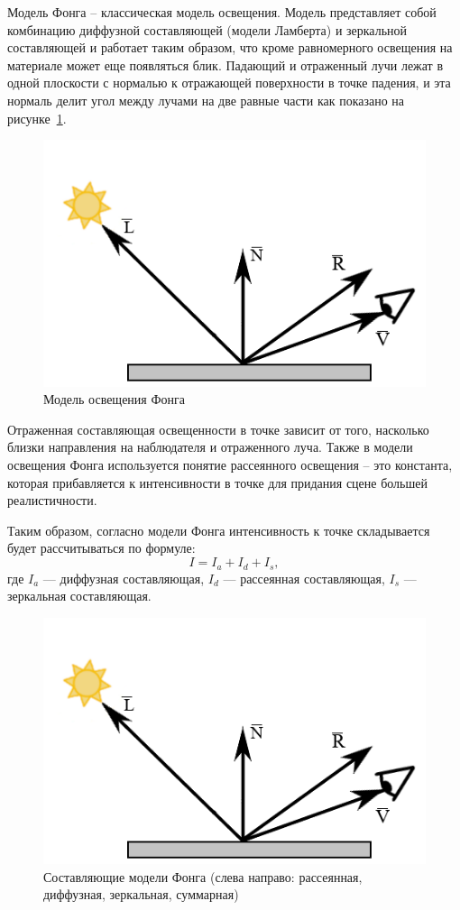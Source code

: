 Модель Фонга – классическая модель освещения. Модель представляет собой комбинацию диффузной составляющей (модели Ламберта) и зеркальной составляющей и работает таким образом, что кроме равномерного освещения на материале может еще появляться блик.
Падающий и отраженный лучи лежат в одной плоскости с нормалью к отражающей поверхности в точке падения, и эта нормаль делит угол между лучами на две равные части как показано на рисунке~\ref{img:fong-light}.

\begin{figure}[h]
	\centering
	\includegraphics[height=0.3\textheight]{img/phong.png}
	\caption{Модель освещения Фонга}
	\label{img:fong-light}
\end{figure}

Отраженная составляющая освещенности в точке зависит от того, насколько близки направления на наблюдателя и отраженного луча.
Также в модели освещения Фонга используется понятие рассеянного освещения – это константа, которая прибавляется к интенсивности в точке для придания сцене большей реалистичности. 
 
Таким образом, согласно модели Фонга интенсивность к точке складывается будет рассчитываться по формуле: 
\begin{equation}
	\label{eq:simple-model}
	I = I_a + I_d + I_s,
\end{equation}
где $I_a$ --- диффузная составляющая, $I_d$ --- рассеянная  составляющая, $I_s$ --- зеркальная составляющая.
 
\begin{figure}[h]
	\centering
	\includegraphics[height=0.3\textheight]{img/phong.png}
	\caption{Составляющие модели Фонга (слева направо: рассеянная, диффузная, зеркальная, суммарная)}
	\label{img:fong-model}
\end{figure}

